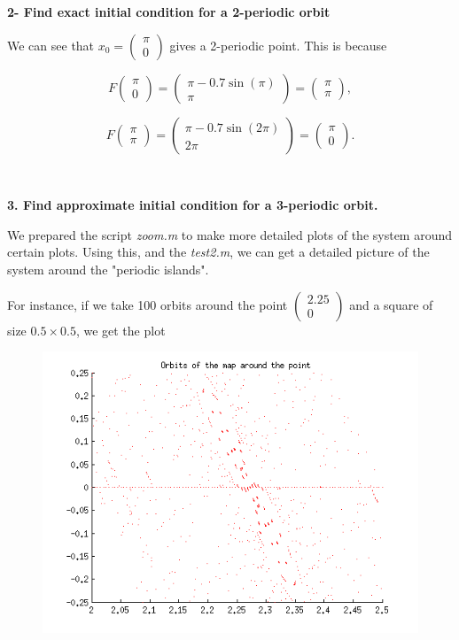 \documentclass[twoside]{article}
\begin{document}
{\bf 2- Find exact initial condition for a 2-periodic orbit}

We can see that $x_0 = \begin{pmatrix}\pi \\ 0 \end{pmatrix}$ gives a 2-periodic point. This is because

$$F \begin{pmatrix}\pi \\ 0 \end{pmatrix} = \begin{pmatrix}\pi - 0.7 \sin(\pi) \\ \pi \end{pmatrix} =  \begin{pmatrix}\pi \\ \pi \end{pmatrix} ,$$

$$F \begin{pmatrix}\pi \\ \pi \end{pmatrix} = \begin{pmatrix}\pi - 0.7 \sin(2\pi) \\ 2\pi \end{pmatrix} = \begin{pmatrix}\pi \\ 0 \end{pmatrix} .$$

\

{\bf 3. Find approximate initial condition for a 3-periodic orbit.}

We prepared the script {\it zoom.m} to make more detailed plots of the system around certain plots. Using this, and the {\it test2.m}, we can get a detailed picture of the system around the "periodic islands".

For instance, if we take 100 orbits around the point $ \begin{pmatrix} 2.25 \\ 0 \end{pmatrix}$ and a square of size $0.5 \times 0.5$, we get the plot

\begin{figure}[ht]
\includegraphics[scale=0.4]{zoom3.png}
\end{figure}
\end{document}
